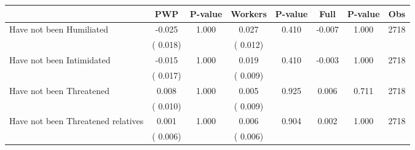 
\begin{tabular}{l*{7}{c}}\hline&\multicolumn{1}{c}{PWP}&\multicolumn{1}{c}{P-value}&\multicolumn{1}{c}{Workers}&\multicolumn{1}{c}{P-value}&\multicolumn{1}{c}{Full}&\multicolumn{1}{c}{P-value}&\multicolumn{1}{c}{Obs} \\ \hline

 Have not been Humiliated       &             -0.025       &        1.000  &              0.027       &        0.410  &             -0.007       &              1.000 &  2718 \\ 
                       &       (       0.018)             &                               &       (       0.012)                     &                               &                                               &                                &                      \\ 

 Have not been Intimidated       &             -0.015       &        1.000  &              0.019       &        0.410  &             -0.003       &              1.000 &  2718 \\ 
                       &       (       0.017)             &                               &       (       0.009)                     &                               &                                               &                                &                      \\ 

 Have not been Threatened       &              0.008       &        1.000  &              0.005       &        0.925  &              0.006       &              0.711 &  2718 \\ 
                       &       (       0.010)             &                               &       (       0.009)                     &                               &                                               &                                &                      \\ 

 Have not been Threatened relatives       &              0.001       &        1.000  &              0.006       &        0.904  &              0.002       &              1.000 &  2718 \\ 
                       &       (       0.006)             &                               &       (       0.006)                     &                               &                                               &                                &                      \\ 


\end{tabular}
